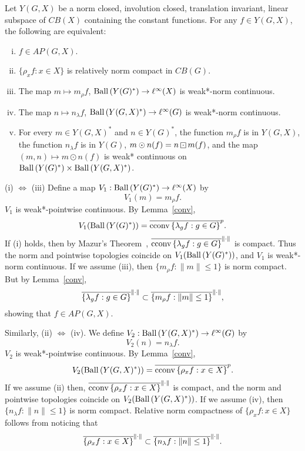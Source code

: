 \begin{theorem}
Let $Y(G,X)$ be a norm closed, involution closed, translation invariant, linear subspace of
$CB(X)$ containing the constant functions.  For any $f\in Y(G,X)$, the following are equivalent:
\begin{enumerate}[(i)]
\item $f\in AP(G,X)$.
\item $\{\rho_x f: x\in X\}$ is relatively norm compact in $CB(G)$.
\item The map $m\mapsto m_\rho f$, $\operatorname{Ball\,}(Y(G)^*)\rightarrow \ell^\infty (X)$ is weak*-norm continuous.
\item The map $n\mapsto n_\lambda f$, $\operatorname{Ball\,}(Y(G,X)^*)\rightarrow \ell^\infty (G)$ is weak*-norm continuous.
\item For every $m\in Y(G,X)^*$ and $n\in Y(G)^*$, the function $m_\rho f$ is in $Y(G,X)$, the function $n_\lambda f$ is in $Y(G)$, $m\odot n(f) = n\dotbox m(f)$, and the map $(m,n) \mapsto m\odot n(f)$ is weak* continuous on $\operatorname{Ball\,}(Y(G)^*) \times \operatorname{Ball\,}(Y(G,X)^*)$.
\end{enumerate}
\end{theorem}
\proof
(i) $\Leftrightarrow$ (iii) Define a map $V_1:\operatorname{Ball\,}(Y(G)^*)\rightarrow \ell^\infty (X)$ by
\[
V_1(m) = m_\rho f.
\]
$V_1$ is weak*-pointwise continuous.  By Lemma~\ref{conv},
\[
V_1(\operatorname{Ball\,}(Y(G)^*)) = \overline{\operatorname{cconv\,}\{\lambda_g f: g\in G\}}^p.
\]
If (i) holds, then by Mazur's Theorem~\cite[V.2.6]{d&s}, $\overline{\operatorname{cconv\,}\{\lambda_g f: g\in G\}}^{\|\cdot\|}$ is compact.
Thus the norm and pointwise topologies coincide on $V_1(\operatorname{Ball\,}(Y(G)^*))$, and $V_1$ is weak*-norm
continuous.  If we assume (iii), then $\{m_\rho f: \|m\| \leq 1\}$ is norm compact.  But by Lemma~\ref{conv},
\[
\overline{\{\lambda_g f: g\in G\}}^{\|\cdot\|} \subset \overline{\{m_\rho f: \|m\| \leq 1\}}^{\|\cdot\|},
\]
showing that $f\in AP(G,X)$.

Similarly, (ii) $\Leftrightarrow$ (iv).  We define $V_2:\operatorname{Ball\,}(Y(G,X)^*)\rightarrow \ell^\infty(G)$ by
\[
V_2(n) = n_\lambda f.
\]
$V_2$ is weak*-pointwise continuous.  By Lemma~\ref{conv},
\[
V_2(\operatorname{Ball\,}(Y(G,X)^*)) = \overline{\operatorname{cconv\,}\{\rho_x f: x\in X\}}^p.
\]
If we assume (ii) then, $\overline{\operatorname{cconv\,}\{\rho_x f: x\in X\}}^{\|\cdot\|}$ is compact,
and the norm and pointwise topologies coincide on $V_2(\operatorname{Ball\,}(Y(G,X)^*))$.  If we assume (iv),
then $\{n_\lambda f: \|n\| \leq 1\}$ is norm compact.  Relative norm compactness of
$\{\rho_x f: x\in X\}$ follows from noticing that
\[
\overline{\{\rho_x f: x\in X\}}^{\|\cdot\|} \subset \overline{\{n_\lambda f: \|n\| \leq 1 \}}^{\|\cdot\|}.
\]

